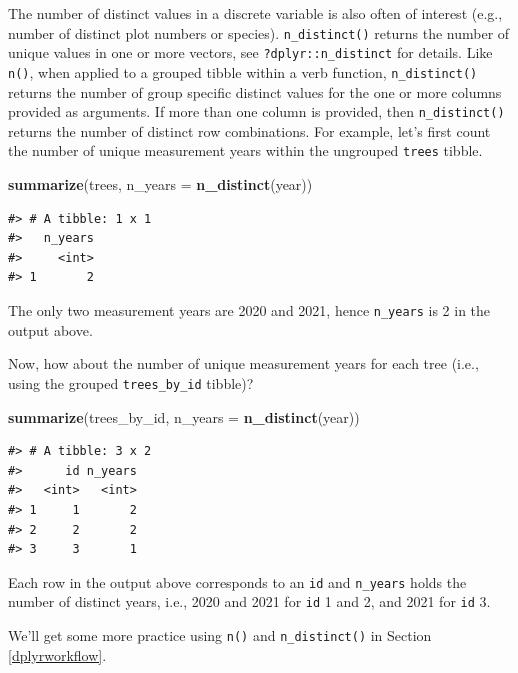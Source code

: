 \documentclass[
  11pt,
]{krantz}
\newenvironment{Shaded}{\begin{snugshade}}{\end{snugshade}}
\newcommand{\DataTypeTok}[1]{\textcolor[rgb]{0.13,0.29,0.53}{#1}}
\newcommand{\KeywordTok}[1]{\textcolor[rgb]{0.13,0.29,0.53}{\textbf{#1}}}
\newcommand{\NormalTok}[1]{#1}
\theoremstyle{definition}
\theoremstyle{definition}
\theoremstyle{definition}
\theoremstyle{definition}
\theoremstyle{remark}
\begin{document}
The number of distinct values in a discrete variable is also often of interest (e.g., number of distinct plot numbers or species). \texttt{n\_distinct()} returns the number of unique values in one or more vectors, see \texttt{?dplyr::n\_distinct} for details. Like \texttt{n()}, when applied to a grouped tibble within a verb function, \texttt{n\_distinct()} returns the number of group specific distinct values for the one or more columns provided as arguments. If more than one column is provided, then \texttt{n\_distinct()} returns the number of distinct row combinations. For example, let's first count the number of unique measurement years within the ungrouped \texttt{trees} tibble.

\begin{Shaded}
\begin{Highlighting}[]
\KeywordTok{summarize}\NormalTok{(trees, }\DataTypeTok{n\_years =} \KeywordTok{n\_distinct}\NormalTok{(year)) }
\end{Highlighting}
\end{Shaded}

\begin{verbatim}
#> # A tibble: 1 x 1
#>   n_years
#>     <int>
#> 1       2
\end{verbatim}

The only two measurement years are 2020 and 2021, hence \texttt{n\_years} is 2 in the output above.

Now, how about the number of unique measurement years for each tree (i.e., using the grouped \texttt{trees\_by\_id} tibble)?

\begin{Shaded}
\begin{Highlighting}[]
\KeywordTok{summarize}\NormalTok{(trees\_by\_id, }\DataTypeTok{n\_years =} \KeywordTok{n\_distinct}\NormalTok{(year)) }
\end{Highlighting}
\end{Shaded}

\begin{verbatim}
#> # A tibble: 3 x 2
#>      id n_years
#>   <int>   <int>
#> 1     1       2
#> 2     2       2
#> 3     3       1
\end{verbatim}

Each row in the output above corresponds to an \texttt{id} and \texttt{n\_years} holds the number of distinct years, i.e., 2020 and 2021 for \texttt{id} 1 and 2, and 2021 for \texttt{id} 3.

We'll get some more practice using \texttt{n()} and \texttt{n\_distinct()} in Section \ref{dplyrworkflow}.
\end{document}
